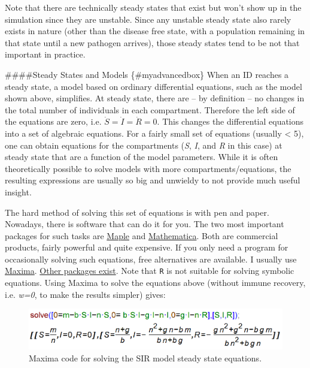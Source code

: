 \documentclass[]{book}
\theoremstyle{definition}
\theoremstyle{definition}
\theoremstyle{definition}
\theoremstyle{remark}
\begin{document}
Note that there are technically steady states that exist but won't show
up in the simulation since they are unstable. Since any unstable steady
state also rarely exists in nature (other than the disease free state,
with a population remaining in that state until a new pathogen arrives),
those steady states tend to be not that important in practice.

\#\#\#\#Steady States and Models \{\#myadvancedbox\} When an ID reaches
a steady state, a model based on ordinary differential equations, such
as the model shown above, simplifies. At steady state, there are -- by
definition -- no changes in the total number of individuals in each
compartment. Therefore the left side of the equations are zero, i.e.
\(\dot S = \dot I = \dot R =0\). This changes the differential equations
into a set of algebraic equations. For a fairly small set of equations
(usually \textless{} 5), one can obtain equations for the compartments
(\emph{S}, \emph{I}, and \emph{R} in this case) at steady state that are
a function of the model parameters. While it is often theoretically
possible to solve models with more compartments/equations, the resulting
expressions are usually so big and unwieldy to not provide much useful
insight.

The hard method of solving this set of equations is with pen and paper.
Nowadays, there is software that can do it for you. The two most
important packages for such tasks are
\href{http://www.maplesoft.com/}{Maple} and
\href{https://www.wolfram.com/mathematica/}{Mathematica}. Both are
commercial products, fairly powerful and quite expensive. If you only
need a program for occasionally solving such equations, free
alternatives are available. I usually use
\href{http://maxima.sourceforge.net/}{Maxima}.
\href{http://en.wikipedia.org/wiki/Comparison_of_computer_algebra_systems}{Other
packages exist}. Note that \texttt{R} is not suitable for solving
symbolic equations. Using Maxima to solve the equations above (without
immune recovery, i.e. \emph{w=0}, to make the results simpler) gives:

\begin{figure}
\centering
\includegraphics{./images/SSmaxima.png}
\caption{\label{fig:SSmaxima}Maxima code for solving the SIR model steady
state equations.}
\end{figure}
\end{document}
